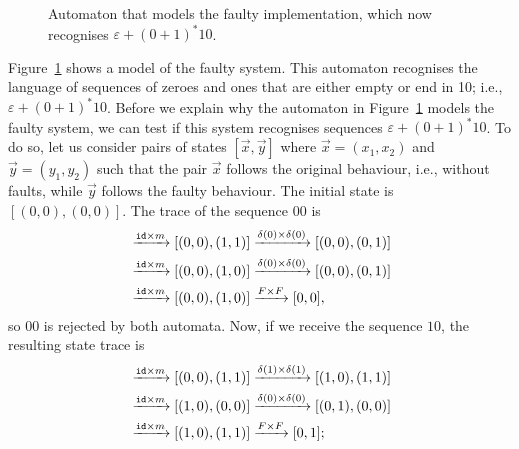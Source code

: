 \begin{figure}[t]
    \centering
{}
\caption{Automaton that models the faulty implementation, which now recognises $\varepsilon+(0+1)^*10$.}
\label{fig:Transformed}
\end{figure}
Figure~\ref{fig:Transformed} shows a model of the faulty system. This automaton recognises the language of sequences of zeroes and ones that are either empty or end in 10; i.e., $\varepsilon+(0+1)^*10$. 
Before we explain why the automaton in Figure~\ref{fig:Transformed} models the faulty system, we can test if this system recognises sequences $\varepsilon+(0+1)^*10$. %
To do so, let us consider pairs of states $[\vec{x},\vec{y}]$ where $\vec{x}=(x_1,x_2)$ and $\vec{y}=(y_1,y_2)$ such that the pair $\vec{x}$ follows the original behaviour, i.e., without faults, while $\vec{y}$ follows the faulty behaviour. 
The initial state is $[(0,0),(0,0)]$. %
The trace of the sequence $00$ is 
\begin{align*}
   [(0,0),(0,0)]&\xrightarrow{\id\times m}[(0,0),(1,1)]\xrightarrow{\delta(0)\times\delta(0)}[(0,0),(0,1)]\\
   &\xrightarrow{\id\times m}[(0,0),(1,0)]\xrightarrow{\delta(0)\times\delta(0)}[(0,0),(0,1)]\\
   &\xrightarrow{\id\times m}[(0,0),(1,0)]\xrightarrow{F\times F}[0,0],
\end{align*}
so $00$ is rejected by both automata. %
Now, if we receive the sequence $10$, the resulting state trace is 
\begin{align*}
    [(0,0),(0,0)]&\xrightarrow{\id\times m}[(0,0),(1,1)]\xrightarrow{\delta(1)\times\delta(1)}[(1,0),(1,1)]\\
   &\xrightarrow{\id\times m}[(1,0),(0,0)]\xrightarrow{\delta(0)\times\delta(0)}[(0,1),(0,0)]\\
   &\xrightarrow{\id\times m}[(1,0),(1,1)]\xrightarrow{F\times F}[0,1];
\end{align*}
